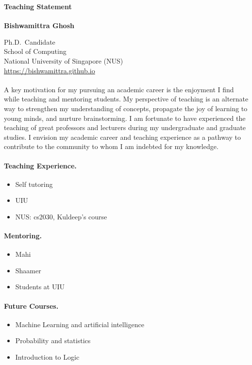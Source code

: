 \documentclass[11pt]{article}
\newcommand{\blue}[1]{\textcolor{blue}{#1}}
\begin{document}
	\noindent\huge \textbf{Teaching Statement} \\
	\vspace{0.1em}\\
	\Large \textbf{Bishwamittra Ghosh}
		
	\normalsize
	\noindent Ph.D.\ Candidate\\
	School of Computing\\
	National University of Singapore (NUS)\\
	\blue{\url{https://bishwamittra.github.io}}



	\paragraph{}
		A key motivation for my pursuing an academic career is the enjoyment I find while teaching and mentoring students. My perspective of teaching is an alternate way to strengthen my understanding of concepts, propagate the joy of learning to young minds, and nurture brainstorming. I am fortunate to have experienced the teaching of great professors and lecturers during my undergraduate and graduate studies. I envision my academic career and teaching experience as a pathway to contribute to the community to whom I am indebted for my knowledge.
	
	\paragraph{Teaching Experience.}
	
		\begin{itemize}
			\item Self tutoring
			\item UIU
			\item NUS: cs2030, Kuldeep's course
		\end{itemize}
	
	\paragraph{Mentoring.}
	
		\begin{itemize}
			\item Mahi
			\item Shaamer
			\item Students at UIU
		\end{itemize}

	
	\paragraph{Future Courses.}
		\begin{itemize}
			\item Machine Learning and artificial intelligence
			\item Probability and statistics
			\item Introduction to Logic
		\end{itemize}
\end{document}

